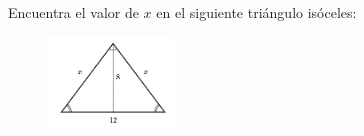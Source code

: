 Encuentra el valor de $x$ en el siguiente triángulo isóceles:
\begin{figure}[H]
    \begin{center}
        \includegraphics[width=0.3\textwidth]{../images/pitagoras5.png}
    \end{center}
    \caption{}
    \label{fig:pitagoras5}
\end{figure}
